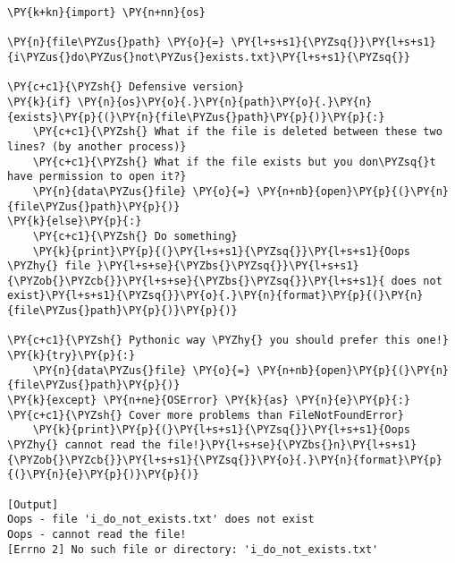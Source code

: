 \begin{Verbatim}[label=\makebox{\url{https://github.com/lucabaldini/cmepda/tree/master/slides/latex/snippets/dont\_ask\_permission.py}},commandchars=\\\{\}]
\PY{k+kn}{import} \PY{n+nn}{os}

\PY{n}{file\PYZus{}path} \PY{o}{=} \PY{l+s+s1}{\PYZsq{}}\PY{l+s+s1}{i\PYZus{}do\PYZus{}not\PYZus{}exists.txt}\PY{l+s+s1}{\PYZsq{}}

\PY{c+c1}{\PYZsh{} Defensive version}
\PY{k}{if} \PY{n}{os}\PY{o}{.}\PY{n}{path}\PY{o}{.}\PY{n}{exists}\PY{p}{(}\PY{n}{file\PYZus{}path}\PY{p}{)}\PY{p}{:}
    \PY{c+c1}{\PYZsh{} What if the file is deleted between these two lines? (by another process)}
    \PY{c+c1}{\PYZsh{} What if the file exists but you don\PYZsq{}t have permission to open it?}
    \PY{n}{data\PYZus{}file} \PY{o}{=} \PY{n+nb}{open}\PY{p}{(}\PY{n}{file\PYZus{}path}\PY{p}{)} 
\PY{k}{else}\PY{p}{:}
    \PY{c+c1}{\PYZsh{} Do something}
    \PY{k}{print}\PY{p}{(}\PY{l+s+s1}{\PYZsq{}}\PY{l+s+s1}{Oops \PYZhy{} file }\PY{l+s+se}{\PYZbs{}\PYZsq{}}\PY{l+s+s1}{\PYZob{}\PYZcb{}}\PY{l+s+se}{\PYZbs{}\PYZsq{}}\PY{l+s+s1}{ does not exist}\PY{l+s+s1}{\PYZsq{}}\PY{o}{.}\PY{n}{format}\PY{p}{(}\PY{n}{file\PYZus{}path}\PY{p}{)}\PY{p}{)}

\PY{c+c1}{\PYZsh{} Pythonic way \PYZhy{} you should prefer this one!}
\PY{k}{try}\PY{p}{:}
    \PY{n}{data\PYZus{}file} \PY{o}{=} \PY{n+nb}{open}\PY{p}{(}\PY{n}{file\PYZus{}path}\PY{p}{)}
\PY{k}{except} \PY{n+ne}{OSError} \PY{k}{as} \PY{n}{e}\PY{p}{:} \PY{c+c1}{\PYZsh{} Cover more problems than FileNotFoundError}
    \PY{k}{print}\PY{p}{(}\PY{l+s+s1}{\PYZsq{}}\PY{l+s+s1}{Oops \PYZhy{} cannot read the file!}\PY{l+s+se}{\PYZbs{}n}\PY{l+s+s1}{\PYZob{}\PYZcb{}}\PY{l+s+s1}{\PYZsq{}}\PY{o}{.}\PY{n}{format}\PY{p}{(}\PY{n}{e}\PY{p}{)}\PY{p}{)}

[Output]
Oops - file 'i_do_not_exists.txt' does not exist
Oops - cannot read the file!
[Errno 2] No such file or directory: 'i_do_not_exists.txt'
\end{Verbatim}
